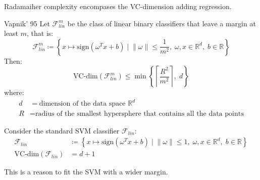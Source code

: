\begin{note}
	Radamaiher complexity encompases the VC-dimension adding
	regression.
\end{note}


\begin{theorem}{Vapnik' 95}{}
	Let $\mathcal{F}_{lin}^m$ be the class of linear binary classifiers that leave
	a margin at least $m$, that is:
	\begin{equation*}
		\mathcal{F}_{lin}^m \coloneqq \left\{
		x \mapsto \text{sign}\left( \omega^T x + b\right) \;\Big|\;
		\lVert \omega \rVert \leq \frac{1}{m^2}, \;
		\omega, x \in \mathds{R}^d,\;
		b \in \mathds{R}
		\right\}
	\end{equation*}
	Then:
	\begin{equation*}
		\text{VC-dim}(\mathcal{F}_{lin}^m)  \leq \min \left\{
		\left\lceil \frac{R^2}{m^2} \right\rceil, \;
		d
		\right\}
  \end{equation*}
  where:
  \begin{align*}
    d                                   &= \text{dimension of the data space } \mathds{R}^d \\
    R                                   &= \text{radius of the smallest hypersphere that contains all the data points}
	\end{align*}

\tcblower

Consider the standard SVM classifier $\mathcal{F}_{lin}$:
\begin{align*}
  \mathcal{F}_{lin} &\coloneqq \left\{ x \mapsto \text{sign}( \omega^T x + b) \mid
	\lVert \omega \rVert \leq 1, \;
	\omega, x \in \mathds{R}^d,\;
	b \in \mathds{R} \right\} \\
  \text{VC-dim}(\mathcal{F}_{lin}) &= d + 1
\end{align*}

\begin{marker}
This is a reason to fit the SVM with a wider margin.
\end{marker}
\end{theorem}
